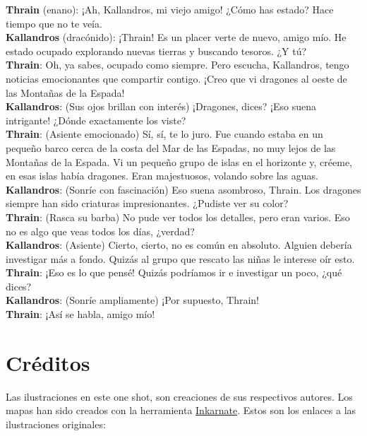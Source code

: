 \documentclass[10pt,twoside,twocolumn,openany]{dndbook}
\begin{document}
\begin{DndReadAloud}
  \textbf{Thrain} (enano): ¡Ah, Kallandros, mi viejo amigo! ¿Cómo has estado? Hace tiempo que no te 
  veía. \\
  \textbf{Kallandros} (dracónido): ¡Thrain! Es un placer verte de nuevo, amigo mío. He estado 
  ocupado explorando nuevas tierras y buscando tesoros. ¿Y tú? \\
  \textbf{Thrain}: Oh, ya sabes, ocupado como siempre. Pero escucha, Kallandros, tengo noticias 
  emocionantes que compartir contigo. ¡Creo que vi dragones al oeste de las Montañas de la Espada! \\
  \textbf{Kallandros}: (Sus ojos brillan con interés) ¡Dragones, dices? ¡Eso suena intrigante! 
  ¿Dónde exactamente los viste? \\
  \textbf{Thrain}: (Asiente emocionado) Sí, sí, te lo juro. Fue cuando estaba en un pequeño barco 
  cerca de la costa del Mar de las Espadas, no muy lejos de las Montañas de la Espada. Vi un 
  pequeño grupo de islas en el horizonte y, créeme, en esas islas había dragones. Eran 
  majestuosos, volando sobre las aguas. \\
  \textbf{Kallandros}: (Sonríe con fascinación) Eso suena asombroso, Thrain. Los dragones siempre
  han sido criaturas impresionantes. ¿Pudiste ver su color? \\
  \textbf{Thrain}: (Rasca su barba) No pude ver todos los detalles, pero eran varios. Eso no es 
  algo que veas todos los días, ¿verdad? \\
  \textbf{Kallandros}: (Asiente) Cierto, cierto, no es común en absoluto. Alguien debería 
  investigar más a fondo. Quizás al grupo que rescato las niñas le interese oír esto. \\
  \textbf{Thrain}: ¡Eso es lo que pensé! Quizás podríamos ir e investigar un poco, ¿qué dices? \\
  \textbf{Kallandros}: (Sonríe ampliamente) ¡Por supuesto, Thrain! \\
  \textbf{Thrain}: ¡Así se habla, amigo mío! \\
\end{DndReadAloud}


\section{Créditos}

Las ilustraciones en este one shot, son creaciones de sus respectivos autores. Los mapas han sido 
creados con la herramienta \href{https://inkarnate.com/}{Inkarnate}. Estos son los enlaces a las 
ilustraciones originales:
\end{document}
